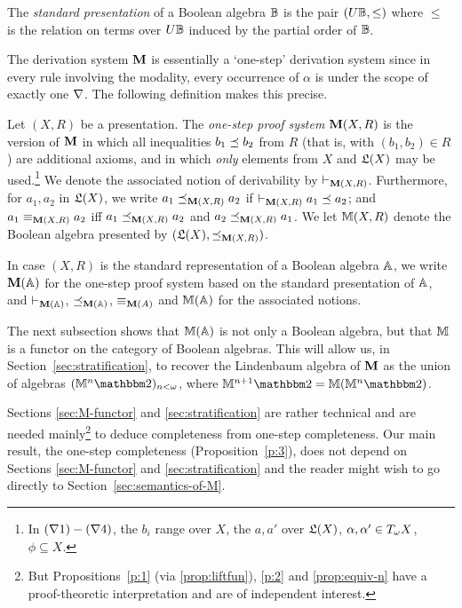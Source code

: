 \documentclass{book}
\begin{document}
\begin{example}
  The {\em standard presentation} of a Boolean algebra $\mathbb{B}$ is the
  pair $(U\mathbb{B},\leq)$ where ${\leq}$ is the relation on terms over
  $U\mathbb{B}$ induced by the partial order of $\mathbb{B}$.
\end{example}

The derivation system $\mathbf{M}$ is essentially a `one-step' derivation system
since in every rule involving the modality, every occurrence of $\alpha$
is under the scope of exactly one $\nabla$.
The following definition makes this precise.

\begin{definition}\label{def:M-one-step}
  Let $(X,R)$ be a presentation.  The \emph{one-step proof system}
  $\mathbf{M}(X,R)$ is the version of $\mathbf{M}$ in which all inequalities
  $b_{1} \preceq b_{2}$ from $R$ (that is, with $(b_{1},b_{2}) \in R$)
  are additional axioms, and in which \emph{only} elements from $X$
  and $\mathfrak{L}(X)$ may be used.\footnote{In $(\nabla1)-(\nabla4)$, the $b_i$
    range over $X$, the $a,a'$ over $\mathfrak{L}(X)$, $\alpha,\alpha'\in T_{\omega}
    X$, $\phi\subseteq X$.}  We denote the associated notion of
  derivability by $\vdash_{\mathbf{M}(X,R)}$.  Furthermore, for
  $a_{1},a_{2}$ in $\mathfrak{L}(X)$, we write $a_{1} \preceq_{\mathbf{M}(X,R)}
  a_{2}$ if $\vdash_{\mathbf{M}(X,R)} a_{1} \preceq a_{2}$; and $a_{1}
  \equiv_{\mathbf{M}(X,R)} a_{2}$ iff $a_{1} \preceq_{\mathbf{M}(X,R)} a_{2}$ and
  $a_{2} \preceq_{\mathbf{M}(X,R)} a_{1}$.  We let $\mathbb{M}(X,R)$ denote the
  Boolean algebra presented by $(\mathfrak{L}(X),{\preceq_{\mathbf{M}(X,R)}})$.

  In case $(X,R)$ is the standard representation of a Boolean algebra
  $\mathbb{A}$, we write $\mathbf{M}(\mathbb{A})$ for the one-step proof
  system based on the standard presentation of $\mathbb{A}$, and
  $\vdash_{\mathbf{M}(\mathbb{A})}$, $\preceq_{\mathbf{M}(\mathbb{A})}$,
  $\equiv_{\mathbf{M}(A)}$ and $\mathbb{M}(\mathbb{A})$ for the associated
  notions.
\end{definition}

The next subsection shows that $\mathbb{M}(\mathbb{A})$ is not only a
Boolean algebra, but that $\mathbb{M}$ is a functor on the category of
Boolean algebras. This will allow us, in
Section~\ref{sec:stratification}, to recover the Lindenbaum algebra of
$\mathbf{M}$ as the union of algebras $(\xxviM^n\xxvibbtwo)_{n<\omega}$,
where $\xxviM^{n+1}\xxvibbtwo=\xxviM(\xxviM^n\xxvibbtwo)$.

Sections \ref{sec:M-functor} and \ref{sec:stratification} are rather
technical and are needed mainly\footnote{But Propositions~\ref{p:1}
  (via \ref{prop:liftfun}), \ref{p:2} and \ref{prop:equiv-n} have a
  proof-theoretic interpretation and are of independent interest.} to
deduce completeness from one-step completeness. Our main result, the
one-step completeness (Proposition~\ref{p:3}), does not depend on
Sections \ref{sec:M-functor} and \ref{sec:stratification} and the
reader might wish to go directly to Section~\ref{sec:semantics-of-M}.
\end{document}
